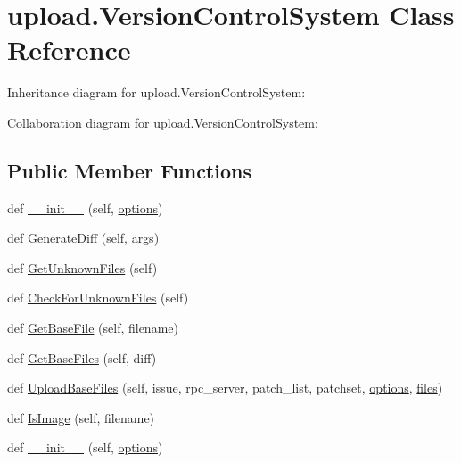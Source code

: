 \hypertarget{classupload_1_1_version_control_system}{}\section{upload.\+Version\+Control\+System Class Reference}
\label{classupload_1_1_version_control_system}


Inheritance diagram for upload.\+Version\+Control\+System\+:


Collaboration diagram for upload.\+Version\+Control\+System\+:
\subsection*{Public Member Functions}
\begin{DoxyCompactItemize}
\item 
def \hyperlink{classupload_1_1_version_control_system_ace97e5785a2b40011404ae6fbb956ecf}{\+\_\+\+\_\+init\+\_\+\+\_\+} (self, \hyperlink{classupload_1_1_version_control_system_a4d57d043bc408887b94269fe4cea9556}{options})
\item 
def \hyperlink{classupload_1_1_version_control_system_aa5eb260c96e7016dab36b5fc136c9f49}{Generate\+Diff} (self, args)
\item 
def \hyperlink{classupload_1_1_version_control_system_a56a60e56aa9aff3df4001d2f84cab884}{Get\+Unknown\+Files} (self)
\item 
def \hyperlink{classupload_1_1_version_control_system_ad2923d691a1b1047e9359c5b7c1c103f}{Check\+For\+Unknown\+Files} (self)
\item 
def \hyperlink{classupload_1_1_version_control_system_adfd9d4ecba422102233a2ba13e5bfaf5}{Get\+Base\+File} (self, filename)
\item 
def \hyperlink{classupload_1_1_version_control_system_a812c3b3daf90c88b015fa4b26252e291}{Get\+Base\+Files} (self, diff)
\item 
def \hyperlink{classupload_1_1_version_control_system_a7e334f967301b9e85e5a9c39f5036823}{Upload\+Base\+Files} (self, issue, rpc\+\_\+server, patch\+\_\+list, patchset, \hyperlink{classupload_1_1_version_control_system_a4d57d043bc408887b94269fe4cea9556}{options}, \hyperlink{files_8js_a0742cac2750bccc2d88ac080fb9daa22}{files})
\item 
def \hyperlink{classupload_1_1_version_control_system_a846889ecd2ef40870b456ddb5b349e02}{Is\+Image} (self, filename)
\item 
def \hyperlink{classupload_1_1_version_control_system_ace97e5785a2b40011404ae6fbb956ecf}{\+\_\+\+\_\+init\+\_\+\+\_\+} (self, \hyperlink{classupload_1_1_version_control_system_a4d57d043bc408887b94269fe4cea9556}{options})

\end{DoxyCompactItemize}
